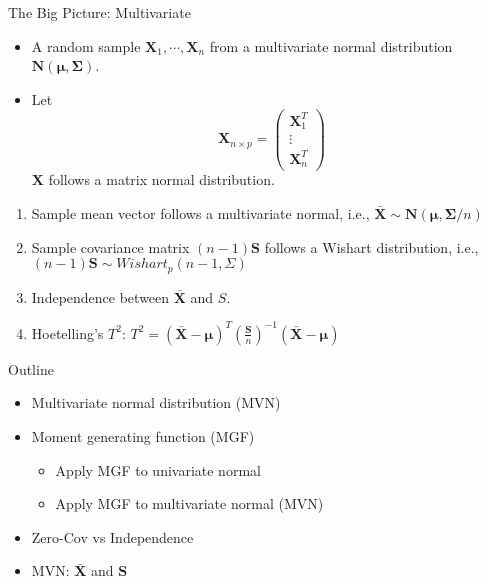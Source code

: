 \documentclass[
  ignorenonframetext,
]{beamer}
\providecommand{\tightlist}{%
  \setlength{\itemsep}{0pt}\setlength{\parskip}{0pt}}
\begin{document}
\begin{frame}{The Big Picture: Multivariate}
\protect\hypertarget{the-big-picture-multivariate}{}
\begin{itemize}
\tightlist
\item
  A random sample \(\mathbf X_1, \cdots, \mathbf X_n\) from a
  multivariate normal distribution
  \(\mathbf N(\boldsymbol \mu, \boldsymbol \Sigma)\).
\item
  Let \[\mathbf X_{n\times p}=\begin{pmatrix}
  \mathbf X_1^T \\ \vdots \\\mathbf X_n^T
  \end{pmatrix}\] \(\mathbf X\) follows a matrix normal distribution.
\end{itemize}

\begin{enumerate}
\item
  Sample mean vector follows a multivariate normal, i.e.,
  \(\bar{\mathbf X} \sim \mathbf N(\boldsymbol \mu, \boldsymbol \Sigma/n)\)
\item
  Sample covariance matrix \((n-1)\mathbf S\) follows a Wishart
  distribution, i.e., \((n-1)\mathbf S \sim Wishart_p (n-1, \Sigma)\)
\item
  Independence between \(\bar {\mathbf X}\) and \(S\).
\item
  Hoetelling's \(T^2\):
  \(T^2 = (\bar{\mathbf X} - \boldsymbol \mu)^T\left(\frac{\mathbf S}{n}\right)^{-1} (\bar{\mathbf X} - \boldsymbol \mu)\)
\end{enumerate}
\end{frame}

\begin{frame}{Outline}
\protect\hypertarget{outline}{}
\begin{itemize}
\tightlist
\item
  Multivariate normal distribution (MVN)
\item
  Moment generating function (MGF)

  \begin{itemize}
  \tightlist
  \item
    Apply MGF to univariate normal
  \item
    Apply MGF to multivariate normal (MVN)
  \end{itemize}
\item
  Zero-Cov vs Independence
\item
  MVN: \(\bar{\mathbf X}\) and \(\mathbf S\)
\end{itemize}
\end{frame}
\end{document}

